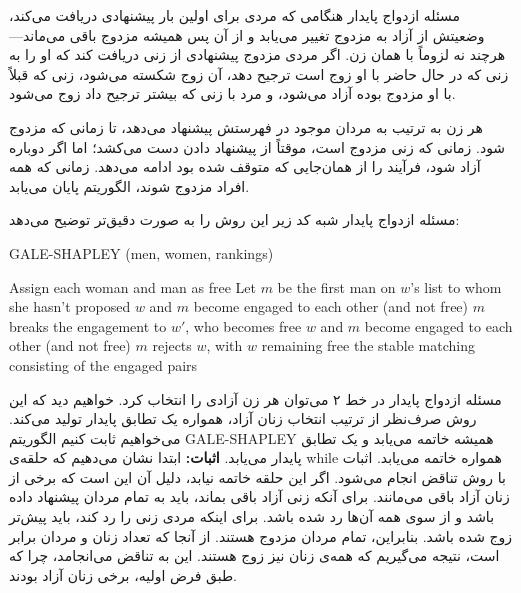 \begin{itemframe}{مسئله ازدواج پایدار}
\itm
هنگامی که مردی برای اولین بار پیشنهادی دریافت می‌کند، وضعیتش از آزاد به مزدوج تغییر می‌یابد و از آن پس همیشه مزدوج باقی می‌ماند—هرچند نه لزوماً با همان زن.
\itm
 اگر مردی مزدوج پیشنهادی از زنی دریافت کند که او را به زنی که در حال حاضر با او زوج است ترجیح دهد، آن زوج شکسته می‌شود، زنی که قبلاً با او مزدوج بوده آزاد می‌شود، و مرد با زنی که بیشتر ترجیح داد زوج می‌شود.

\itm
هر زن به ترتیب به مردان موجود در فهرستش پیشنهاد می‌دهد، تا زمانی که مزدوج شود. زمانی که زنی مزدوج است، موقتاً از پیشنهاد دادن دست می‌کشد؛ اما اگر دوباره آزاد شود، فرآیند را از همان‌جایی که متوقف شده بود ادامه می‌دهد.
\itm
زمانی که همه افراد مزدوج شوند، الگوریتم پایان می‌یابد.
\end{itemframe}


\begin{itemframe}{مسئله ازدواج پایدار}
\itm
شبه کد زیر این روش را به صورت دقیق‌تر توضیح می‌دهد:
\begin{algorithm}[H]\alglr
\caption{GALE-SHAPLEY (men, women, rankings)}
\begin{algorithmic}[1]
\State Assign each woman and man as free
    \State Let $m$ be the first man on $w$’s list to whom she hasn't proposed
        \State $w$ and $m$ become engaged to each other (and not free)
        \State $m$ breaks the engagement to $w'$, who becomes free
        \State $w$ and $m$ become engaged to each other (and not free)
    \Else
        \State $m$ rejects $w$, with $w$ remaining free
    \EndIf
\EndWhile
\State \Return the stable matching consisting of the engaged pairs
\end{algorithmic}
\end{algorithm}

\end{itemframe}


\begin{itemframe}{مسئله ازدواج پایدار}
\itm
در خط ۲ می‌توان هر زن آزادی را انتخاب کرد. خواهیم دید که این روش صرف‌نظر از ترتیب انتخاب زنان آزاد، همواره یک تطابق پایدار تولید می‌کند.
\itm
‌می‌خواهیم ثابت کنیم الگوریتم GALE-SHAPLEY همیشه خاتمه می‌یابد و یک تطابق پایدار می‌یابد.
\itm
\textbf{اثبات:}
 ابتدا نشان می‌دهیم که حلقه‌ی while همواره خاتمه می‌یابد. اثبات با روش تناقض انجام می‌شود. اگر این حلقه خاتمه نیابد، دلیل آن این است که برخی از زنان آزاد باقی می‌مانند. برای آنکه زنی آزاد باقی بماند، باید به تمام مردان پیشنهاد داده باشد و از سوی همه آن‌ها رد شده باشد.
\itm
 برای اینکه مردی زنی را رد کند، باید پیش‌تر زوج شده باشد. بنابراین، تمام مردان مزدوج هستند. از آنجا که تعداد زنان و مردان برابر است، نتیجه می‌گیریم که همه‌ی زنان نیز زوج هستند. این به تناقض می‌انجامد، چرا که طبق فرض اولیه، برخی زنان آزاد بودند.
\end{itemframe}


